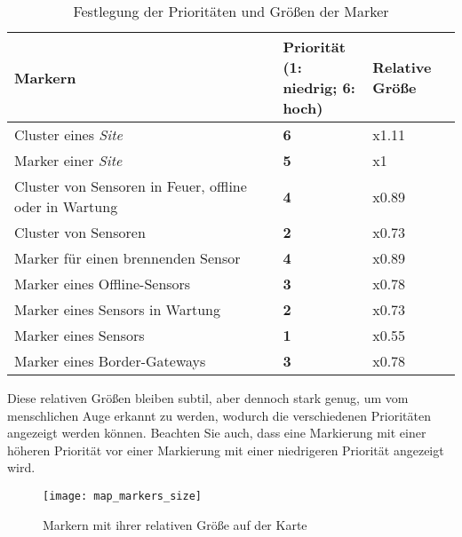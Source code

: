 \begin{table}[H]
  \begin{tabular}{p{0.6\linewidth} |p{0.2\linewidth}|p{0.2\linewidth}}
    Markern                                                & Priorität (1: niedrig; 6: hoch) & Relative Größe \\ \hline\hline

    Cluster eines \textit{Site}                            & \textbf{6}                      & x1.11          \\\hline
    Marker einer \textit{Site}                             & \textbf{5}                      & x1             \\\hline
    Cluster von Sensoren in Feuer, offline oder in Wartung & \textbf{4}                      & x0.89          \\\hline
    Cluster von Sensoren                                   & \textbf{2}                      & x0.73          \\\hline
    Marker für einen brennenden Sensor                     & \textbf{4}                      & x0.89          \\\hline
    Marker eines Offline-Sensors                           & \textbf{3}                      & x0.78          \\\hline
    Marker eines Sensors in Wartung                        & \textbf{2}                      & x0.73          \\\hline
    Marker eines Sensors                                   & \textbf{1}                      & x0.55          \\\hline
    Marker eines Border-Gateways                           & \textbf{3}                      & x0.78
  \end{tabular}
  \caption{Festlegung der Prioritäten und Größen der Marker}
\end{table}

Diese relativen Größen bleiben subtil, aber dennoch stark genug, um vom menschlichen Auge erkannt zu werden, wodurch die verschiedenen Prioritäten angezeigt werden können.
Beachten Sie auch, dass eine Markierung mit einer höheren Priorität vor einer Markierung mit einer niedrigeren Priorität angezeigt wird.

\begin{figure}[H]
  \centering
  \texttt{[image: map\_markers\_size]}
  \caption{Markern mit ihrer relativen Größe auf der Karte}
  \label{fig:map_markers_size}
\end{figure}

